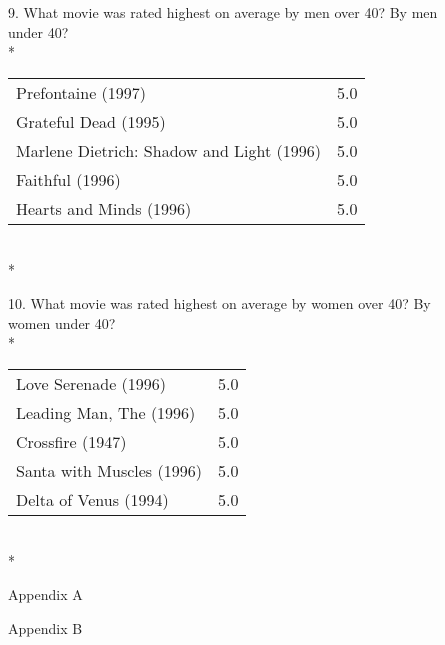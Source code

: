 \documentclass{article}
\begin{document}
9.  What movie was rated highest on average by men over 40? By men\\
under 40?\\*
\begin{tabular}{ l r }
Prefontaine (1997) & 5.0 \\
Grateful Dead (1995) & 5.0 \\
Marlene Dietrich: Shadow and Light (1996) & 5.0 \\
Faithful (1996) & 5.0 \\
Hearts and Minds (1996) & 5.0 \\
\end{tabular}
\\*

10. What movie was rated highest on average by women over 40? By\\
women under 40?\\*
\begin{tabular}{ l r }
Love Serenade (1996) & 5.0 \\
Leading Man, The (1996) & 5.0 \\
Crossfire (1947) & 5.0 \\
Santa with Muscles (1996) & 5.0 \\
Delta of Venus (1994) & 5.0 \\
\end{tabular}
\\*

\appendix
\newpage
Appendix A


\newpage
Appendix B

\end{document}
